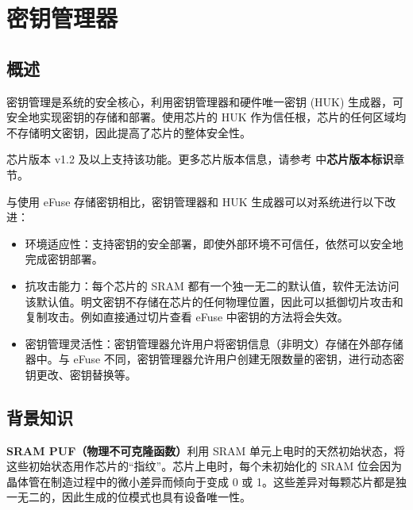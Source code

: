 \documentclass[main\_\_CN.tex]{subfiles}
\begin{document}

\ifglobal
\else
    \listoftodos
    {\let\clearpage\relax \listofdonetodos}
    \tableofcontents
\fi




\hypertarget{keymng}{}
\chapter{密钥管理器}
\label{mod:keymng}

\section{概述}
密钥管理是系统的安全核心，利用密钥管理器和硬件唯一密钥 (HUK) 生成器，可安全地实现密钥的存储和部署。使用芯片的 HUK 作为信任根，芯片的任何区域均不存储明文密钥，因此提高了芯片的整体安全性。

\begin{tiplisting}
    芯片版本 v1.2 及以上支持该功能。更多芯片版本信息，请参考 \doclinkerrataCN 中\textbf{芯片版本标识}章节。
\end{tiplisting}

与使用 eFuse 存储密钥相比，密钥管理器和 HUK 生成器可以对系统进行以下改进：
\begin{itemize}
    \item 环境适应性：支持密钥的安全部署，即使外部环境不可信任，依然可以安全地完成密钥部署。
    \item 抗攻击能力：每个芯片的 SRAM 都有一个独一无二的默认值，软件无法访问该默认值。明文密钥不存储在芯片的任何物理位置，因此可以抵御切片攻击和复制攻击。例如直接通过切片查看 eFuse 中密钥的方法将会失效。
    \item 密钥管理灵活性：密钥管理器允许用户将密钥信息（非明文）存储在外部存储器中。与 eFuse 不同，密钥管理器允许用户创建无限数量的密钥，进行动态密钥更改、密钥替换等。

\end{itemize}

\section{背景知识}

\textbf{SRAM PUF（物理不可克隆函数）}利用 SRAM 单元上电时的天然初始状态，将这些初始状态用作芯片的“指纹”。芯片上电时，每个未初始化的 SRAM 位会因为晶体管在制造过程中的微小差异而倾向于变成 0 或 1。这些差异对每颗芯片都是独一无二的，因此生成的位模式也具有设备唯一性。
\end{document}
